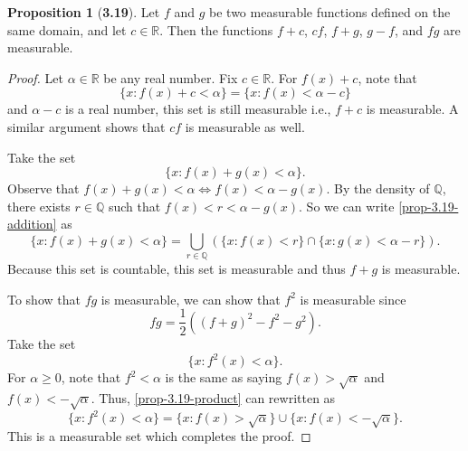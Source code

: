 \documentclass[12pt]{article}
\newcommand{\R}{\mathbb{R}}
\newcommand{\Q}{\mathbb{Q}}
\theoremstyle{definition}
\newtheorem*{prop}{Proposition}
\begin{document}
\begin{prop}[\textbf{3.19}]
    
    Let \(f \) and \( g \) be two measurable functions defined on the same domain, and let \( c \in \R \). Then the functions \( f + c \), \( cf \), \( f + g \), \( g - f \), and \( fg \) are measurable.

        \begin{proof}
            Let \( \alpha \in \R \) be any real number. Fix \( c \in \R \). For \( f(x) + c \), note that 
                \[
                    \{ x: f(x) + c < \alpha \} = \{ x: f(x) < \alpha - c \}
                \]
            and \( \alpha - c \) is a real number, this set is still measurable i.e., \( f + c \) is measurable. A similar argument shows that \( cf \) is measurable as well. 

            Take the set 
                \begin{equation}
                    \label{prop-3.19-addition}
                    \{ x : f(x) + g(x) < \alpha \}.    
                \end{equation}
            Observe that \( f(x) + g(x) < \alpha \Leftrightarrow  f(x) < \alpha - g(x) \). By the density of \( \Q \), there exists \( r \in \Q \) such that \( f(x) < r < \alpha - g(x) \). So we can write \cref{prop-3.19-addition} as
                \[
                    \{ x : f(x) + g(x) < \alpha \} = \bigcup_{r \in \Q}  \left( \{ x : f(x) < r \} \cap \{ x : g(x) < \alpha - r \} \right).
                \]
            Because this set is countable, this set is measurable and thus \( f + g \) is measurable. 

            To show that \( fg \) is measurable, we can show that \( f^2 \) is measurable since \
                \[
                 fg = \frac{1}{2} \left( (f+g)^2 - f^2 - g^2 \right).
                \]
            Take the set 
                \begin{equation}
                    \label{prop-3.19-product}
                    \{ x : f^{2}(x) < \alpha \}. 
                \end{equation}
            For \( \alpha \geq 0 \), note that \( f^{2} < \alpha \) is the same as saying \( f(x) > \sqrt{\alpha} \) and \( f(x) < -\sqrt{\alpha} \). Thus, \cref{prop-3.19-product} can rewritten as 
                \[
                    \{ x : f^{2}(x) < \alpha \} = \{ x: f(x) > \sqrt{\alpha} \} \cup \{x: f(x) < -\sqrt{\alpha} \}.
                \]
            This is a measurable set which completes the proof.
            \end{proof}
\end{prop}
            
\end{document}
